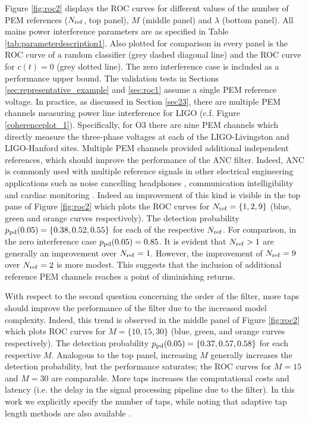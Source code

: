 \documentclass[pra,superscriptaddress,reprint,amsmath,amssymb,nofootinbib]{revtex4-2}
\begin{document}
Figure \ref{fig:roc2} displays the ROC curves for different values of the number of PEM references ($N_{\rm ref}$, top panel), $M$ (middle panel) and $\lambda$ (bottom panel). All mains power interference parameters are as specified in Table \ref{tab:parameterdescription1}. Also plotted for comparison in every panel is the ROC curve of a random classifier (grey dashed diagonal line) and the ROC curve for $c(t) = 0$ (grey dotted line). The zero interference case is included as a performance upper bound. The validation tests in Sections \ref{sec:representative_example} and \ref{sec:roc1} assume a single PEM reference voltage. In practice, as discussed in Section \ref{sec23}, there are multiple PEM channels measuring power line interference for LIGO (c.f. Figure \ref{coherenceplot_1}). Specifically, for O3 there are nine PEM channels which directly measure the three-phase voltages at each of the LIGO-Livingston and LIGO-Hanford sites. Multiple PEM channels provided additional independent references, which should improve the performance of the ANC filter. Indeed, ANC is commonly used with multiple reference signals in other electrical engineering applications such as noise cancelling headphones \citep{10.1121/1.5109394}, communication intelligibility \citep{KUO1996669,doi:10.1177/1084713812456906} and cardiac monitoring \citep{7755741}. Indeed an improvement of this kind is visible in the top pane of Figure \ref{fig:roc2} which plots the ROC curves for $N_{\rm ref} = \{ 1,2,9 \}$ (blue, green and orange curves respectively). The detection probability $p_{\rm pd} (0.05) = \{ 0.38,0.52,0.55 \}$ for each of the respective $N_{\rm ref}$. For comparison, in the zero interference case $p_{\rm pd}(0.05) = 0.85$. It is evident that $N_{\rm ref} > 1$ are generally an improvement over $N_{\rm ref} = 1$. However, the improvement of $N_{\rm ref} =9$ over $N_{\rm ref} =2$ is more modest. This suggests that the inclusion of additional reference PEM channels reaches a point of diminishing returns. \newline 


With respect to the second question concerning the order of the filter, more taps should improve the performance of the filter due to the increased model complexity. Indeed, this trend is observed in the middle panel of Figure \ref{fig:roc2}  which plots ROC curves for $M = \{10,15,30\}$ (blue, green, and orange curves respectively). The detection probability $p_{\rm pd} (0.05) = \{0.37, 0.57, 0.58\}$ for each respective $M$. Analogous to the top panel, increasing $M$ generally increases the detection probability, but the performance saturates; the ROC curves for $M=15$ and $M=30$ are comparable. More taps increases the computational costs and latency (i.e. the delay in the signal processing pipeline due to the filter). In this work we explicitly specify the number of taps, while noting that adaptive tap length methods are also available \citep[e.g.][]{1326385,KAR2017422,KAR2020107043}. \newline 
\end{document}
